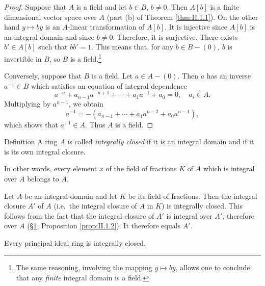 \begin{proof}
Suppose that $A$ is a field and let $b\in B$, $b\neq0$. Then $A[b]$ is a
finite dimensional vector space over $A$ (part (b) of Theorem
\ref{thm:II.1.1}). On the other hand $y\mapsto by$ is an $A$-linear
transformation of $A[b]$. It is injective since $A[b]$ is an integral domain
and since $b\neq0$. Therefore, it is surjective. There exists $b'\in A[b]$
such that $bb'=1$. This means that, for any $b\in B-(0)$, $b$ is invertible
in $B$, so $B$ is a field.\footnote{The same reasoning, involving the
mapping $y\mapsto by$, allows one to conclude that any \emph{finite}
integral domain is a field.}

Conversely, suppose that $B$ is a field. Let $a\in A-(0)$. Then $a$ has an
inverse $a^{-1}\in B$ which satisfies an equation of integral dependence
\[
a^{-n}+a_{n-1}a^{-n+1}+\cdots+a_{1}a^{-1}+a_{0}=0,\quad a_{i}\in A.
\]
Multiplying by $a^{n-1}$, we obtain
\[
a^{-1}=-\left(a_{n-1}+\cdots+a_{1}a^{n-2}+a_{0}a^{n-1}\right),
\]
which shows that $a^{-1}\in A$. Thus $A$ is a field.
\end{proof}


\begin{statement}{Definition}
A ring $A$ is called \emph{integrally closed} if it is an integral domain and
if it is its own integral closure.
\end{statement}

In other words, every element $x$ of the field of fractions $K$ of $A$ which
is integral over $A$ belongs to $A$.

\begin{example}\label{exa:II.2.1}
Let $A$ be an integral domain and let $K$ be its field of fractions. Then the
integral closure $A'$ of $A$ (i.e.\ the integral closure of $A$ in $K$) is
integrally closed. This follows from the fact that the integral closure of
$A'$ is integral over $A'$, therefore over $A$ (\hyperref[sec:2.1]{§1}, Proposition
\ref{prop:II.1.2}). It therefore equals $A'$.
\end{example}

\begin{example}\label{exa:II.2.2}
Every principal ideal ring is integrally closed.
\end{example}


